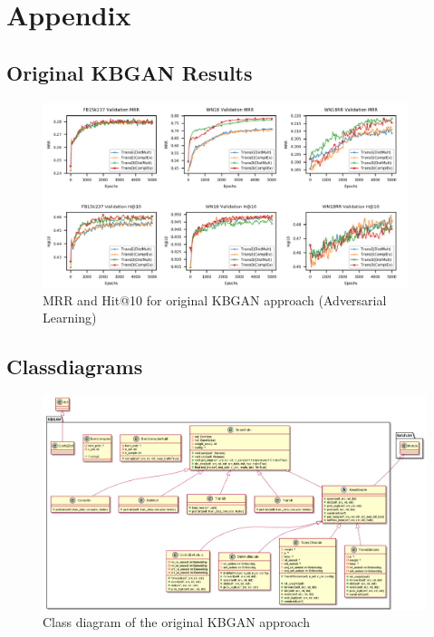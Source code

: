 %
\chapter{Appendix}
\label{sec:appendix}

\section{Original KBGAN Results}
\label{sec:appendix:originalkbganresults}

\begin{figure}
  \centering
    \includegraphics[width=0.95\textwidth]{appendices/original_results.png}
  \caption{MRR and Hit@10 for original KBGAN approach \cite{cai2017kbgan} (Adversarial Learning)}
  \label{fig:originalkbganresults}
\end{figure}

\clearpage

\section{Classdiagrams}
\label{sec:appendix:classdiagrams}

\begin{figure}
  \centering
    \includegraphics[width=\textwidth]{appendices/kbgan_classdiagram.png}
  \caption{Class diagram of the original \ac{KBGAN} approach}
  \label{fig:overview}
\end{figure}

